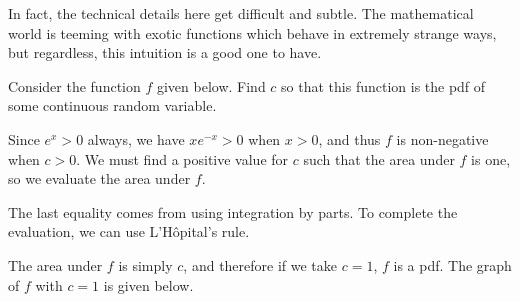 \rmk In fact, the technical details here get difficult and subtle. The mathematical world is teeming with exotic functions which behave in extremely strange ways, but regardless, this intuition is a good one to have.

\begin{examp}Consider the function $f$ given below. Find $c$ so that this function is the pdf of some continuous random variable.
\renewcommand*{\arraystretch}{1.35}
\renewcommand*{\arraystretch}{1}
\par
\noindent Since $e^{x}>0$ always, we have $xe^{-x} > 0$ when $x > 0$, and thus $f$ is non-negative when $c > 0$. We must find a positive value for $c$ such that the area under $f$ is one, so we evaluate the area under $f$.
\par
\noindent The last equality comes from using integration by parts. To complete the evaluation, we can use L'H\^{o}pital's rule.
\par
\noindent The area under $f$ is simply $c$, and therefore if we take $c=1$, $f$ is a pdf. The graph of $f$ with $c = 1$ is given below.
\begin{center}
\end{center}
\end{examp}

